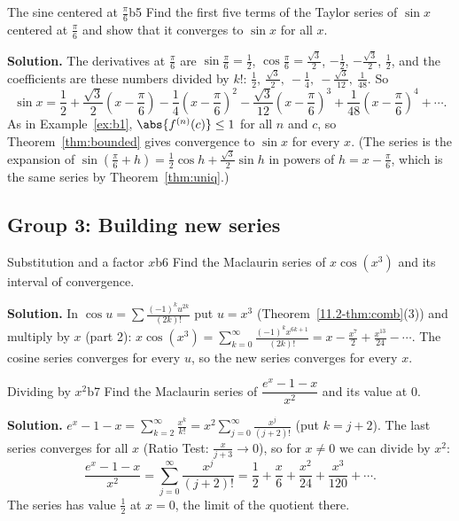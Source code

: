 \documentclass[11pt]{article}
\begin{document}
\begin{exmp}{The sine centered at $\frac\pi6$}{b5}
Find the first five terms of the Taylor series of $\sin x$ centered at $\frac\pi6$ and show that it converges to $\sin x$ for all $x$.

\textbf{Solution.} The derivatives at $\frac\pi6$ are $\sin\frac\pi6=\frac12$, $\cos\frac\pi6=\frac{\sqrt3}2$, $-\frac12$, $-\frac{\sqrt3}2$, $\frac12$, and the coefficients are these numbers divided by $k!$: $\frac12,\ \frac{\sqrt3}2,\ -\frac14,\ -\frac{\sqrt3}{12},\ \frac1{48}$. So
\[
\sin x=\frac12+\frac{\sqrt3}2\left(x-\frac\pi6\right)-\frac14\left(x-\frac\pi6\right)^2-\frac{\sqrt3}{12}\left(x-\frac\pi6\right)^3+\frac1{48}\left(x-\frac\pi6\right)^4+\cdots .
\]
As in Example~\ref{ex:b1}, $\abs{f^{(n)}(c)}\le1$ for all $n$ and $c$, so Theorem~\ref{thm:bounded} gives convergence to $\sin x$ for every $x$. (The series is the expansion of $\sin\left(\frac\pi6+h\right)=\frac12\cos h+\frac{\sqrt3}2\sin h$ in powers of $h=x-\frac\pi6$, which is the same series by Theorem~\ref{thm:uniq}.)
\end{exmp}

\subsection*{Group 3: Building new series}

\begin{exmp}{Substitution and a factor $x$}{b6}
Find the Maclaurin series of $x\cos(x^3)$ and its interval of convergence.

\textbf{Solution.} In $\cos u=\sum\frac{(-1)^ku^{2k}}{(2k)!}$ put $u=x^3$ (Theorem~\ref{11.2-thm:comb}(3)) and multiply by $x$ (part 2): $x\cos(x^3)=\sum_{k=0}^\infty\frac{(-1)^kx^{6k+1}}{(2k)!}=x-\frac{x^7}2+\frac{x^{13}}{24}-\cdots$. The cosine series converges for every $u$, so the new series converges for every $x$.
\end{exmp}

\begin{exmp}{Dividing by $x^2$}{b7}
Find the Maclaurin series of $\dfrac{e^x-1-x}{x^2}$ and its value at $0$.

\textbf{Solution.} $e^x-1-x=\sum_{k=2}^\infty\frac{x^k}{k!}=x^2\sum_{j=0}^\infty\frac{x^j}{(j+2)!}$ (put $k=j+2$). The last series converges for all $x$ (Ratio Test: $\frac{x}{j+3}\to0$), so for $x\ne0$ we can divide by $x^2$:
\[
\frac{e^x-1-x}{x^2}=\sum_{j=0}^\infty\frac{x^j}{(j+2)!}=\frac12+\frac x6+\frac{x^2}{24}+\frac{x^3}{120}+\cdots .
\]
The series has value $\frac12$ at $x=0$, the limit of the quotient there.
\end{exmp}
\end{document}
